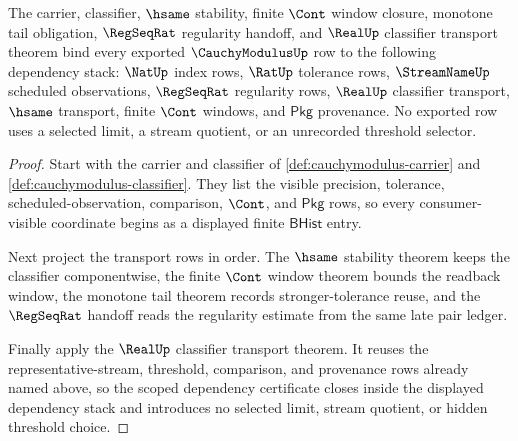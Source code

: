 \begin{theorem}
\label{thm:cauchymodulus-scoped-dependency-certificate}
The carrier, classifier, $\hsame$ stability, finite $\Cont$ window closure,
monotone tail obligation, $\RegSeqRat$ regularity handoff, and $\RealUp$
classifier transport theorem bind every exported $\CauchyModulusUp$ row to the
following dependency stack: $\NatUp$ index rows, $\RatUp$ tolerance rows,
$\StreamNameUp$ scheduled observations, $\RegSeqRat$ regularity rows, $\RealUp$
classifier transport, $\hsame$ transport, finite $\Cont$ windows, and
$\mathsf{Pkg}$ provenance. No exported row uses a selected limit, a stream
quotient, or an unrecorded threshold selector.
\end{theorem}
\begin{proof}
Start with the carrier and classifier of
\autoref{def:cauchymodulus-carrier} and
\autoref{def:cauchymodulus-classifier}. They list the visible precision,
tolerance, scheduled-observation, comparison, $\Cont$, and $\mathsf{Pkg}$ rows,
so every consumer-visible coordinate begins as a displayed finite
$\mathsf{BHist}$ entry.

Next project the transport rows in order. The $\hsame$ stability theorem keeps
the classifier componentwise, the finite $\Cont$ window theorem bounds the
readback window, the monotone tail theorem records stronger-tolerance reuse,
and the $\RegSeqRat$ handoff reads the regularity estimate from the same late
pair ledger.

Finally apply the $\RealUp$ classifier transport theorem. It reuses the
representative-stream, threshold, comparison, and provenance rows already named
above, so the scoped dependency certificate closes inside the displayed
dependency stack and introduces no selected limit, stream quotient, or hidden
threshold choice.
\end{proof}

